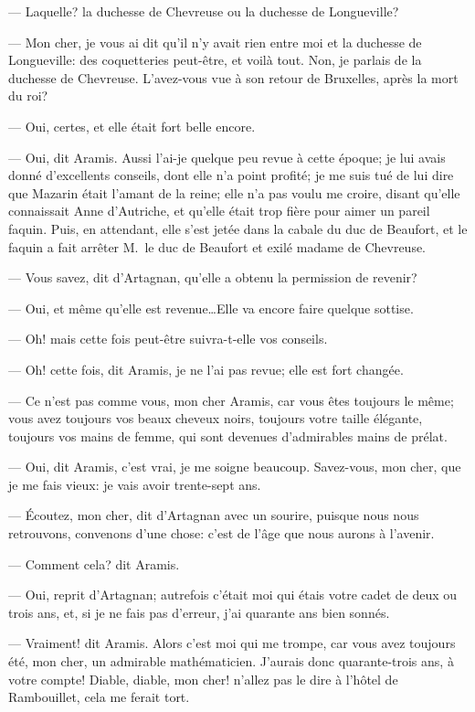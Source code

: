 — Laquelle? la duchesse de Chevreuse ou la duchesse de Longueville?

— Mon cher, je vous ai dit qu'il n'y avait rien entre moi et la duchesse de Longueville: des coquetteries peut-être, et voilà tout. Non, je parlais de la duchesse de Chevreuse. L'avez-vous vue à son retour de Bruxelles, après la mort du roi?

— Oui, certes, et elle était fort belle encore.

— Oui, dit Aramis. Aussi l'ai-je quelque peu revue à cette époque; je lui avais donné d'excellents conseils, dont elle n'a point profité; je me suis tué de lui dire que Mazarin était l'amant de la reine; elle n'a pas voulu me croire, disant qu'elle connaissait Anne d'Autriche, et qu'elle était trop fière pour aimer un pareil faquin. Puis, en attendant, elle s'est jetée dans la cabale du duc de Beaufort, et le faquin a fait arrêter M.~le duc de Beaufort et exilé madame de Chevreuse.

— Vous savez, dit d'Artagnan, qu'elle a obtenu la permission de revenir?

— Oui, et même qu'elle est revenue\dots Elle va encore faire quelque sottise.

— Oh! mais cette fois peut-être suivra-t-elle vos conseils.

— Oh! cette fois, dit Aramis, je ne l'ai pas revue; elle est fort changée.

— Ce n'est pas comme vous, mon cher Aramis, car vous êtes toujours le même; vous avez toujours vos beaux cheveux noirs, toujours votre taille élégante, toujours vos mains de femme, qui sont devenues d'admirables mains de prélat.

— Oui, dit Aramis, c'est vrai, je me soigne beaucoup. Savez-vous, mon cher, que je me fais vieux: je vais avoir trente-sept ans.

— Écoutez, mon cher, dit d'Artagnan avec un sourire, puisque nous nous retrouvons, convenons d'une chose: c'est de l'âge que nous aurons à l'avenir.

— Comment cela? dit Aramis.

— Oui, reprit d'Artagnan; autrefois c'était moi qui étais votre cadet de deux ou trois ans, et, si je ne fais pas d'erreur, j'ai quarante ans bien sonnés.

— Vraiment! dit Aramis. Alors c'est moi qui me trompe, car vous avez toujours été, mon cher, un admirable mathématicien. J'aurais donc quarante-trois ans, à votre compte! Diable, diable, mon cher! n'allez pas le dire à l'hôtel de Rambouillet, cela me ferait tort.


